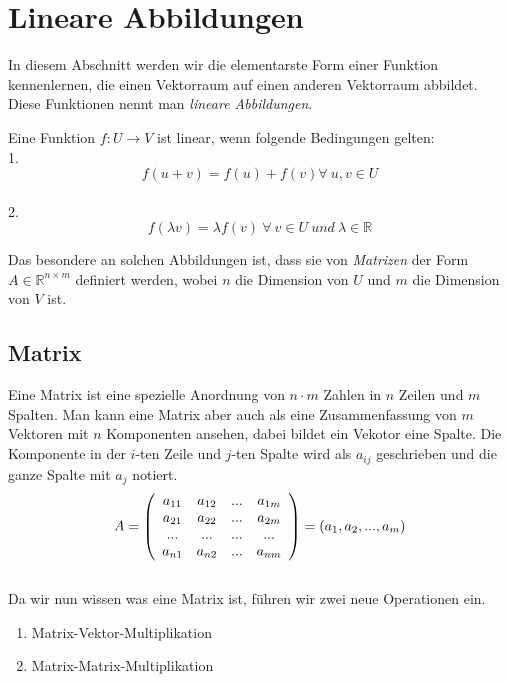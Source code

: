 
\section{Lineare Abbildungen}

In diesem Abschnitt werden wir die elementarste Form einer Funktion kennenlernen, die einen Vektorraum auf einen anderen Vektorraum abbildet. Diese Funktionen nennt man \textit{lineare Abbildungen}.
\begin{Def}
	\label{Def:Def_1}
Eine Funktion $f:U \stackrel{}{\rightarrow} V$ ist linear, wenn folgende Bedingungen gelten: \\ 
1.
\begin{equation*}
 f(u+v) = f(u)+f(v) \forall \ u,v \in U
\end{equation*}\\
2.
\begin{equation*}
 f(\lambda v) = \lambda f(v) \ \forall \ v \in U \ und \ \lambda \in \mathbb{R}
\end{equation*}
\end{Def}

Das besondere an solchen Abbildungen ist, dass sie von \textit{Matrizen} der Form $A \in \mathbb{R}^{n \times m}$ definiert werden, wobei $n$ die Dimension von $U$ und $m$ die Dimension von $V$ ist.

\subsection{Matrix}
Eine Matrix ist eine spezielle Anordnung von $n\cdot m$ Zahlen in $n$ Zeilen und $m$ Spalten. Man kann eine Matrix aber auch als eine Zusammenfassung von $m$ Vektoren mit $n$ Komponenten ansehen, dabei bildet ein Vekotor eine Spalte. Die Komponente in der $i$-ten Zeile und $j$-ten Spalte wird als $a_{ij}$ geschrieben und die ganze Spalte mit $a_j$ notiert.\\
\begin{equation*}
A= \left(
   \begin{array}{cccc}
	  a_{11} & a_{12} & ... & a_{1m}\\
		a_{21} & a_{22} & ... & a_{2m}\\
		...   & ...   & ... & ...  \\
		a_{n1} & a_{n2} & ... & a_{nm}
	 \end{array}
	 \right) = (a_1, a_2, ..., a_m)\\
\end{equation*}
\\
Da wir nun wissen was eine Matrix ist, führen wir zwei neue Operationen ein.
\begin{enumerate}
	\item Matrix-Vektor-Multiplikation
	\item Matrix-Matrix-Multiplikation
\end{enumerate}

